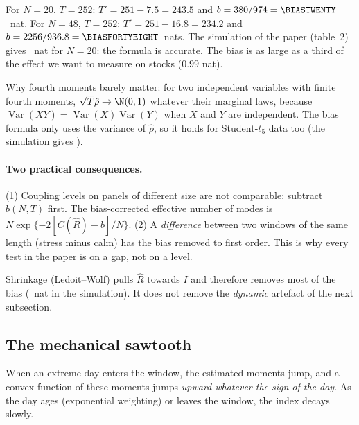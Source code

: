 \begin{exemple}
For $N=20$, $T=252$: $T'=251-7.5=243.5$ and $b=380/974=\BIASTWENTY$~nat. For
$N=48$, $T=252$: $T'=251-16.8=234.2$ and $b=2256/936.8=\BIASFORTYEIGHT$~nats.
The simulation of the paper (table~2) gives \BIASTWENTYMC~nat for $N=20$: the
formula is accurate. The bias is as large as a third of the effect we want
to measure on stocks ($0.99$ nat).
\end{exemple}

\begin{intuition}
Why fourth moments barely matter: for two independent variables with finite
fourth moments, $\sqrt T\hat\rho\to\N(0,1)$ whatever their marginal laws,
because $\operatorname{Var}(XY)=\operatorname{Var}(X)\operatorname{Var}(Y)$
when $X$ and $Y$ are independent. The bias formula only uses the variance of
$\hat\rho$, so it holds for Student-$t_5$ data too (the simulation gives
\BIASTWENTYT).
\end{intuition}

\paragraph{Two practical consequences.} (1) Coupling levels on panels of
different size are not comparable: subtract $b(N,T)$ first. The
bias-corrected effective number of modes is $N\exp\{-2[C(\hat R)-b]/N\}$.
(2) A \emph{difference} between two windows of the same length (stress minus
calm) has the bias removed to first order. This is why every test in the
paper is on a gap, not on a level.

\begin{piege}
Shrinkage (Ledoit--Wolf) pulls $\hat R$ towards $I$ and therefore removes most
of the bias (\BIASTWENTYLW~nat in the simulation). It does not remove the
\emph{dynamic} artefact of the next subsection.
\end{piege}

\subsection{The mechanical sawtooth}

When an extreme day enters the window, the estimated moments jump, and a
convex function of these moments jumps \emph{upward whatever the sign of the
day}. As the day ages (exponential weighting) or leaves the window, the index
decays slowly.

